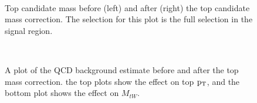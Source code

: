 \begin{figure}[Htcb]
\centering
{}\\
\caption{Top candidate mass before (left) and after (right) the top candidate mass correction.  The selection for this plot is the full selection in the signal region.}
\label{figs:bsdatatmass}
\end{figure}

\begin{figure}[Htcb]
\centering
{}\\
\caption{A plot of the QCD background estimate before and after the top mass correction.  the top plots show the effect on top $\mathrm{p_{T}}$, and the bottom plot shows the effect on $M_{tW}$.}
\label{figs:bsmodmasseffect}
\end{figure}





